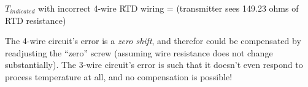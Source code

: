 \vskip 10pt

$T_{indicated}$ with incorrect 4-wire RTD wiring =  (transmitter sees 149.23 ohms of RTD resistance)

\vskip 10pt

The 4-wire circuit's error is a {\it zero shift}, and therefor could be compensated by readjusting the ``zero'' screw (assuming wire resistance does not change substantially).  The 3-wire circuit's error is such that it doesn't even respond to process temperature at all, and no compensation is possible!




